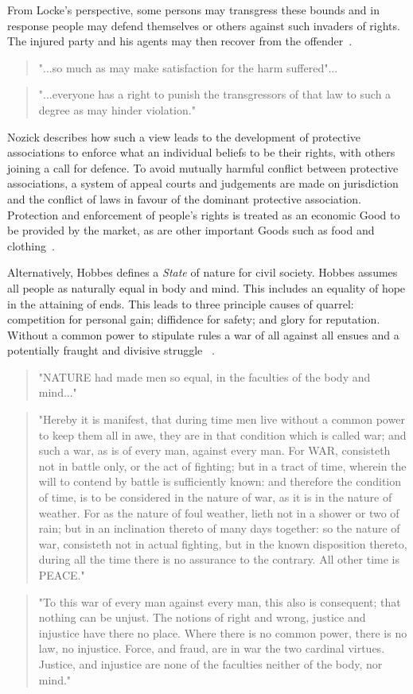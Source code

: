 \documentclass[11pt, oneside]{article}   	%
\begin{document}
From Locke's perspective, some persons may transgress these bounds and in response people may defend themselves or others against such invaders of rights.
The injured party and his agents may then recover from the offender~\cite{jl1}.

\begin{quote}
"...so much as may make satisfaction for the harm suffered"...
\end{quote}
\begin{quote}
"...everyone has a right to punish the transgressors of that law to such a degree as may hinder violation."
\end{quote}

Nozick describes how such a view leads to the development of protective associations to enforce what an individual beliefs to be their rights, with others joining a call for defence.
To avoid mutually harmful conflict between protective associations, a system of appeal courts and judgements are made on jurisdiction and the conflict of laws in favour of the dominant protective association.
Protection and enforcement of people's rights is treated as an economic Good to be provided by the market, as are other important Goods such as food and clothing~\cite{rn1}.\

Alternatively, Hobbes defines a \emph{State} of nature for civil society.
Hobbes assumes all people as naturally equal in body and mind.
This includes an equality of hope in the attaining of ends.
This leads to three principle causes of quarrel: competition for personal gain; diffidence for safety; and glory for reputation. Without a common power to stipulate rules a war of all against all ensues and a potentially fraught and divisive struggle ~\cite{th1}.

\begin{quote}
"NATURE had made men so equal, in the faculties of the body and mind..."
\end{quote}
\begin{quote}
"Hereby it is manifest, that during time men live without a common power to keep them all in awe, they are in that condition which is called war; and such a war, as is of every man, against every man. For WAR, consisteth not in battle only, or the act of fighting; but in a tract of time, wherein the will to contend by battle is sufficiently known: and therefore the condition of time, is to be considered in the nature of war, as it is in the nature of weather. For as the nature of foul weather, lieth not in a shower or two of rain; but in an inclination thereto of many days together: so the nature of war, consisteth not in actual fighting, but in the known disposition thereto, during all the time there is no assurance to the contrary. All other time is PEACE."
\end{quote}
\begin{quote}
"To this war of every man against every man, this also is consequent; that nothing can be unjust. The notions of right and wrong, justice and injustice have there no place. Where there is no common power, there is no law, no injustice. Force, and fraud, are in war the two cardinal virtues. Justice, and injustice are none of the faculties neither of the body, nor mind."
\end{quote}
\end{document}
